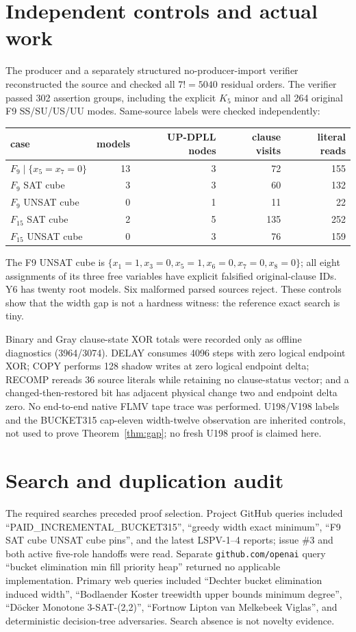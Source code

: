 \documentclass[11pt]{article}
\begin{document}
\section{Independent controls and actual work}
The producer and a separately structured no-producer-import verifier reconstructed the source and checked all $7!=5040$ residual orders.  The verifier passed 302 assertion groups, including the explicit $K_5$ minor and all 264 original F9 SS/SU/US/UU modes.  Same-source labels were checked independently:
\begin{center}
\begin{tabular}{lrrrr}
\toprule
case & models & UP-DPLL nodes & clause visits & literal reads\\\midrule
$F_9\mid\{x_5=x_7=0\}$ &13&3&72&155\\
$F_9$ SAT cube&3&3&60&132\\
$F_9$ UNSAT cube&0&1&11&22\\
$F_{15}$ SAT cube&2&5&135&252\\
$F_{15}$ UNSAT cube&0&3&76&159\\\bottomrule
\end{tabular}
\end{center}
The F9 UNSAT cube is $\{x_1=1,x_3=0,x_5=1,x_6=0,x_7=0,x_8=0\}$; all eight assignments of its three free variables have explicit falsified original-clause IDs.  Y6 has twenty root models.  Six malformed parsed sources reject.  These controls show that the width gap is not a hardness witness: the reference exact search is tiny.

Binary and Gray clause-state XOR totals were recorded only as offline diagnostics (3964/3074).  DELAY consumes 4096 steps with zero logical endpoint XOR; COPY performs 128 shadow writes at zero logical endpoint delta; RECOMP rereads 36 source literals while retaining no clause-status vector; and a changed-then-restored bit has adjacent physical change two and endpoint delta zero.  No end-to-end native FLMV tape trace was performed.  U198/V198 labels and the BUCKET315 cap-eleven width-twelve observation are inherited controls, not used to prove Theorem~\ref{thm:gap}; no fresh U198 proof is claimed here.

\section{Search and duplication audit}
The required searches preceded proof selection.  Project GitHub queries included ``PAID\_INCREMENTAL\_BUCKET315'', ``greedy width exact minimum'', ``F9 SAT cube UNSAT cube pins'', and the latest LSPV-1--4 reports; issue \#3 and both active five-role handoffs were read.  Separate \texttt{github.com/openai} query ``bucket elimination min fill priority heap'' returned no applicable implementation.  Primary web queries included ``Dechter bucket elimination induced width'', ``Bodlaender Koster treewidth upper bounds minimum degree'', ``D\"ocker Monotone 3-SAT-(2,2)'', ``Fortnow Lipton van Melkebeek Viglas'', and deterministic decision-tree adversaries.  Search absence is not novelty evidence.
\end{document}
